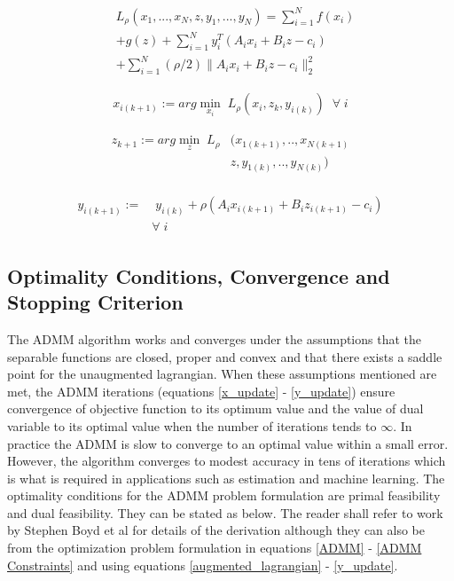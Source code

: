 \documentclass[letterpaper, 10 pt, conference]{ieeeconf}  %
\begin{document}
\begin{align} \label{augmented_lagrangian}
\begin{split}
& L_{\rho}(x_1, ..., x_N,z,y_1,...,y_N)  = \sum\limits_{i=1}^{N}f(x_i) \\
& + g(z) + \sum\limits_{i=1}^{N}y_{i}^T(A_ix_i+B_iz-c_i) \\
& + \sum\limits_{i=1}^{N}(\rho/2)\|A_ix_i+B_iz-c_i\|_{2}^{2}
\end{split}
\end{align} 

\begin{equation}  \label{x_update}
x_{i(k+1)} := arg \min_{x_i} \; L_{\rho}(x_i,z_k,y_{i(k)}) \;\; \forall \; i
\end{equation}

\begin{align}  \label{z_update}
\begin{split}
z_{k+1} := arg \min_{z} \;  L_{\rho} 
& (x_{1(k+1)},..,x_{N(k+1)} \\
& z,y_{1(k)},..,y_{N(k)})
\end{split}
\end{align}

\begin{align}  \label{y_update}
\begin{split}
y_{i(k+1)} := 
& \; y_{i(k)} +  \rho (A_ix_{i(k+1)}+B_iz_{i(k+1)}-c_i) \\
& \forall \; i
\end{split}
\end{align}

\subsection{Optimality Conditions, Convergence and Stopping Criterion}

The ADMM algorithm works and converges under the assumptions that the separable functions are closed, proper and convex and that there exists a saddle point for the unaugmented lagrangian. When these assumptions mentioned are met, the ADMM iterations (equations \ref{x_update} - \ref{y_update}) ensure convergence of objective function to its optimum value and the value of dual variable to its optimal value when the number of iterations tends to $\infty$. In practice the ADMM is slow to converge to an optimal value within a small error. However, the algorithm converges to modest accuracy in tens of iterations which is what is required in applications such as estimation and machine learning. The optimality conditions for the ADMM problem formulation are primal feasibility and dual feasibility. They can be stated as below. The reader shall refer to work by Stephen Boyd et al \cite{boyd2011distributed} for details of the derivation although they can also be from the optimization problem formulation in equations \ref{ADMM} - \ref{ADMM Constraints} and using equations \ref{augmented_lagrangian} - \ref{y_update}.
\end{document}

